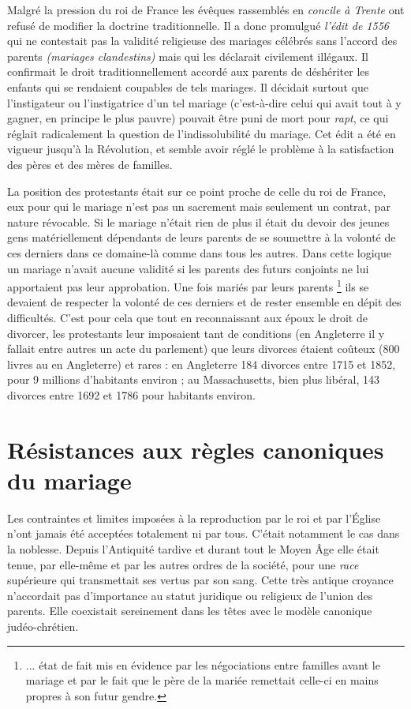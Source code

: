  Malgré la pression du roi de France les évêques rassemblés en \emph{concile à Trente} ont refusé de modifier la doctrine traditionnelle. Il a donc promulgué \emph{l'édit de 1556} qui ne contestait pas la validité religieuse des mariages célébrés sans l'accord des parents \emph{(mariages clandestins)} mais qui les déclarait civilement illégaux. Il confirmait le droit traditionnellement accordé aux parents de déshériter les enfants qui se rendaient coupables de tels mariages. Il décidait surtout que l'instigateur ou l'instigatrice d'un tel mariage (c'est-à-dire celui qui avait tout à y gagner, en principe le plus pauvre) pouvait être puni de mort pour \emph{rapt}, ce qui réglait radicalement la question de l'indissolubilité du mariage. Cet édit a été en vigueur jusqu'à la Révolution, et semble avoir réglé le problème à la satisfaction des pères et des mères de familles. 

 La position des protestants était sur ce point proche de celle du roi de France, eux pour qui le mariage n'est pas un sacrement mais seulement un contrat, par nature révocable. Si le mariage n'était rien de plus il était du devoir des jeunes gens matériellement dépendants de leurs parents de se soumettre à la volonté de ces derniers dans ce domaine-là comme dans tous les autres. Dans cette logique un mariage n'avait aucune validité si les parents des futurs conjoints ne lui apportaient pas leur approbation. Une fois mariés par leurs parents%
\footnote{... état de fait mis en évidence par les négociations entre familles avant le mariage et par le fait que le père de la mariée remettait celle-ci en mains propres à son futur gendre.} 
ils se devaient de respecter la volonté de ces derniers et de rester ensemble en dépit des difficultés. C'est pour cela que tout en reconnaissant aux époux le droit de divorcer, les protestants leur imposaient tant de conditions (en Angleterre il y fallait entre autres un acte du parlement) que leurs divorces étaient coûteux (800 livres au  en Angleterre) et rares : en Angleterre 184 divorces entre 1715 et 1852, pour 9 millions d'habitants environ ; au Massachusetts, bien plus libéral, 143 divorces entre 1692 et 1786 pour  habitants environ. 

\section{Résistances aux règles canoniques du mariage}

 Les contraintes et limites imposées à la reproduction par le roi et par l'Église n'ont jamais été acceptées totalement ni par tous. C'était notamment le cas dans la noblesse. Depuis l'Antiquité tardive et durant tout le Moyen Âge elle était tenue, par elle-même et par les autres ordres de la société, pour une \emph{race} supérieure qui transmettait ses vertus par son sang. Cette très antique croyance n'accordait pas d'importance au statut juridique ou religieux de l'union des parents. Elle coexistait sereinement dans les têtes avec le modèle canonique judéo-chrétien. 

